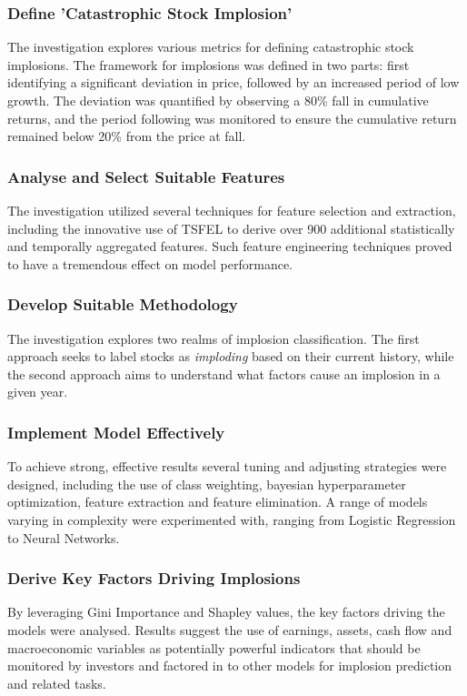 \documentclass[a4paper]{report}
\begin{document}
\subsubsection{Define 'Catastrophic Stock Implosion'}
The investigation explores various metrics for defining catastrophic stock implosions. The framework for implosions was defined in two parts: first identifying a significant deviation 
in price, followed by an increased period of low growth. The deviation was quantified by observing a 80\% fall in cumulative returns, and the period following was 
monitored to ensure the cumulative return remained below 20\% from the price at fall. 

\subsubsection{Analyse and Select Suitable Features}
The investigation utilized several techniques for feature selection and extraction, including the innovative use of TSFEL to derive over 900 
additional statistically and temporally aggregated features. Such feature engineering techniques proved to have a tremendous effect on model performance. 

\subsubsection{Develop Suitable Methodology}
The investigation explores two realms of implosion classification. The first approach seeks to label stocks as \textit{imploding} based on their current history, 
while the second approach aims to understand what factors cause an implosion in a given year.

\subsubsection{Implement Model Effectively}
To achieve strong, effective results several tuning and adjusting strategies were designed, including the use of class weighting, bayesian hyperparameter optimization, feature 
extraction and feature elimination. A range of models varying in complexity were experimented with, ranging from Logistic Regression to Neural Networks. 

\subsubsection{Derive Key Factors Driving Implosions}
By leveraging Gini Importance and Shapley values, the key factors driving the models were analysed. Results suggest the use of
earnings, assets, cash flow and macroeconomic variables as potentially powerful indicators that should be monitored by investors and factored in to other models for 
implosion prediction and related tasks. 
\end{document}
